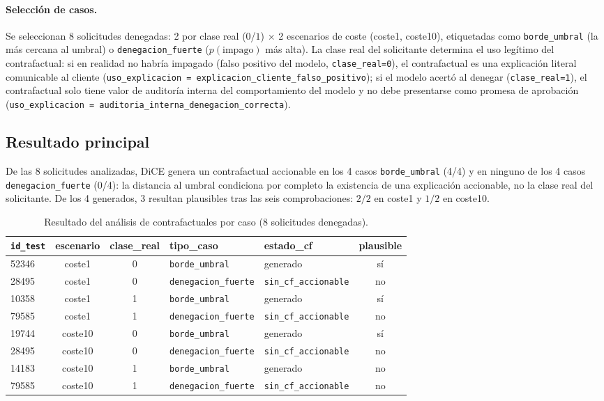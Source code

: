 \documentclass[11pt,a4paper]{article}
\begin{document}
\paragraph{Selección de casos.} Se seleccionan 8 solicitudes denegadas: 2 por clase real ($0$/$1$) $\times$ 2 escenarios de coste (coste1, coste10), etiquetadas como \texttt{borde\_umbral} (la más cercana al umbral) o \texttt{denegacion\_fuerte} ($p(\text{impago})$ más alta). La clase real del solicitante determina el uso legítimo del contrafactual: si en realidad no habría impagado (falso positivo del modelo, \texttt{clase\_real=0}), el contrafactual es una explicación literal comunicable al cliente (\texttt{uso\_explicacion = explicacion\_cliente\_falso\_positivo}); si el modelo acertó al denegar (\texttt{clase\_real=1}), el contrafactual solo tiene valor de auditoría interna del comportamiento del modelo y no debe presentarse como promesa de aprobación (\texttt{uso\_explicacion = auditoria\_interna\_denegacion\_correcta}).

\subsection{Resultado principal}

De las 8 solicitudes analizadas, DiCE genera un contrafactual accionable en los 4 casos \texttt{borde\_umbral} (4/4) y en ninguno de los 4 casos \texttt{denegacion\_fuerte} (0/4): la distancia al umbral condiciona por completo la existencia de una explicación accionable, no la clase real del solicitante. De los 4 generados, 3 resultan plausibles tras las seis comprobaciones: $2/2$ en coste1 y $1/2$ en coste10.

\begin{table}[H]
\centering
\caption{Resultado del análisis de contrafactuales por caso (8 solicitudes denegadas).}
\label{tab:cf_ejemplos}
\begin{tabular}{lccllc}
\toprule
\texttt{id\_test} & escenario & clase\_real & tipo\_caso & estado\_cf & plausible \\
\midrule
52346 & coste1  & 0 & \texttt{borde\_umbral}      & generado             & sí \\
28495 & coste1  & 0 & \texttt{denegacion\_fuerte} & \texttt{sin\_cf\_accionable} & no \\
10358 & coste1  & 1 & \texttt{borde\_umbral}      & generado             & sí \\
79585 & coste1  & 1 & \texttt{denegacion\_fuerte} & \texttt{sin\_cf\_accionable} & no \\
19744 & coste10 & 0 & \texttt{borde\_umbral}      & generado             & sí \\
28495 & coste10 & 0 & \texttt{denegacion\_fuerte} & \texttt{sin\_cf\_accionable} & no \\
14183 & coste10 & 1 & \texttt{borde\_umbral}      & generado             & no \\
79585 & coste10 & 1 & \texttt{denegacion\_fuerte} & \texttt{sin\_cf\_accionable} & no \\
\bottomrule
\end{tabular}
\end{table}
\end{document}
